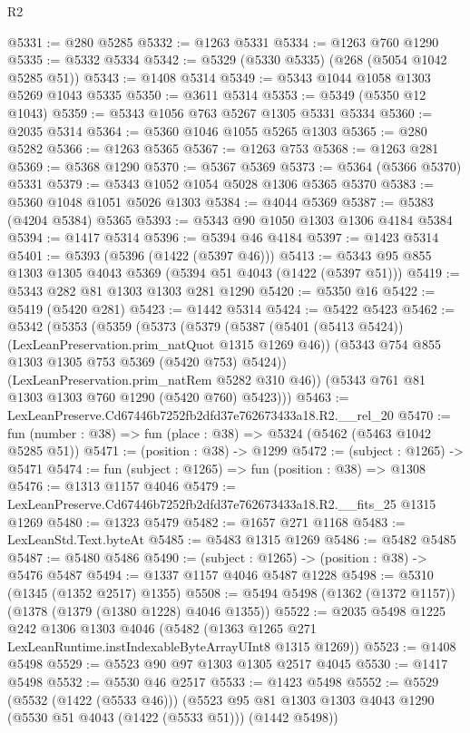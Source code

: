 \begin{lexlean}{R2}
\begin{coremodule}
@5331 := @280 @5285
@5332 := @1263 @5331
@5334 := @1263 @760 @1290
@5335 := @5332 @5334
@5342 := @5329 (@5330 @5335) (@268 (@5054 @1042 @5285 @51))
@5343 := @1408 @5314
@5349 := @5343 @1044 @1058 @1303 @5269 @1043 @5335
@5350 := @3611 @5314
@5353 := @5349 (@5350 @12 @1043)
@5359 := @5343 @1056 @763 @5267 @1305 @5331 @5334
@5360 := @2035 @5314
@5364 := @5360 @1046 @1055 @5265 @1303
@5365 := @280 @5282
@5366 := @1263 @5365
@5367 := @1263 @753
@5368 := @1263 @281
@5369 := @5368 @1290
@5370 := @5367 @5369
@5373 := @5364 (@5366 @5370) @5331
@5379 := @5343 @1052 @1054 @5028 @1306 @5365 @5370
@5383 := @5360 @1048 @1051 @5026 @1303
@5384 := @4044 @5369
@5387 := @5383 (@4204 @5384) @5365
@5393 := @5343 @90 @1050 @1303 @1306 @4184 @5384
@5394 := @1417 @5314
@5396 := @5394 @46 @4184
@5397 := @1423 @5314
@5401 := @5393 (@5396 (@1422 (@5397 @46)))
@5413 := @5343 @95 @855 @1303 @1305 @4043 @5369 (@5394 @51 @4043 (@1422 (@5397 @51)))
@5419 := @5343 @282 @81 @1303 @1303 @281 @1290
@5420 := @5350 @16
@5422 := @5419 (@5420 @281)
@5423 := @1442 @5314
@5424 := @5422 @5423
@5462 := @5342
    (@5353
      (@5359
        (@5373
          (@5379
            (@5387 (@5401 (@5413 @5424)) (LexLeanPreservation.prim_natQuot @1315 @1269 @46))
            (@5343 @754 @855 @1303 @1305 @753 @5369 (@5420 @753) @5424))
          (LexLeanPreservation.prim_natRem @5282 @310 @46))
        (@5343 @761 @81 @1303 @1303 @760 @1290 (@5420 @760) @5423)))
@5463 := LexLeanPreserve.Cd67446b7252fb2dfd37e762673433a18.R2.__rel_20
@5470 := fun (number : @38) => fun (place : @38) => @5324 (@5462 (@5463 @1042 @5285 @51))
@5471 := (position : @38) -> @1299
@5472 := (subject : @1265) -> @5471
@5474 := fun (subject : @1265) => fun (position : @38) => @1308
@5476 := @1313 @1157 @4046
@5479 := LexLeanPreserve.Cd67446b7252fb2dfd37e762673433a18.R2.__fits_25 @1315 @1269
@5480 := @1323 @5479
@5482 := @1657 @271 @1168
@5483 := LexLeanStd.Text.byteAt
@5485 := @5483 @1315 @1269
@5486 := @5482 @5485
@5487 := @5480 @5486
@5490 := (subject : @1265) -> (position : @38) -> @5476 @5487
@5494 := @1337 @1157 @4046 @5487 @1228
@5498 := @5310 (@1345 (@1352 @2517) @1355)
@5508 := @5494 @5498 (@1362 (@1372 @1157)) (@1378 (@1379 (@1380 @1228) @4046 @1355))
@5522 := @2035
    @5498
    @1225
    @242
    @1306
    @1303
    @4046
    (@5482 (@1363 @1265 @271 LexLeanRuntime.instIndexableByteArrayUInt8 @1315 @1269))
@5523 := @1408 @5498
@5529 := @5523 @90 @97 @1303 @1305 @2517 @4045
@5530 := @1417 @5498
@5532 := @5530 @46 @2517
@5533 := @1423 @5498
@5552 := @5529
    (@5532 (@1422 (@5533 @46)))
    (@5523 @95 @81 @1303 @1303 @4043 @1290 (@5530 @51 @4043 (@1422 (@5533 @51))) (@1442 @5498))

\end{coremodule}
\end{lexlean}

